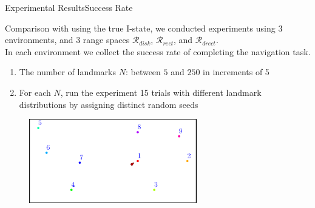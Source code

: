 \begin{frame}{Experimental Results}{Success Rate}
     \small{Comparison with using the true I-state, we conducted experiments using 3
     environments, and 3 range spaces $\mathcal{R}_{disk}$, $\mathcal{R}_{rect}$,
     and  $\mathcal{R}_{drect}$. \\
     In each environment we collect the success rate of completing the navigation
     task. 
     \begin{enumerate}
     \item The number of landmarks $N$: between $5$ and $250$ in increments of 5
     \item For each $N$, run the experiment 15 trials with different landmark
       distributions by assigning distinct random seeds
     \end{enumerate}
    }
    \begin{figure}
      \centering
      \includegraphics[width=0.65\textwidth]{figs/blank}
    \end{figure}
\end{frame}